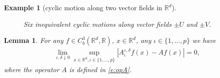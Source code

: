 \documentclass[10pt,a4paper]{amsart}
\newtheorem{exa}{Example}
\newtheorem{lem}{Lemma}
\newcommand{\bR}{\mathbb{R}}
\newcommand{\ba}{\begin{equation}\begin{aligned}}
\newcommand{\e}{\varepsilon}
\newcommand{\ea}{\end{aligned}\end{equation}}
\begin{document}
\begin{exa}[cyclic motion along two vector fields in $\bR^d$]
\begin{figure}
\begin{center}

\end{center}
\caption{Six inequivalent cyclic motions along vector fields $\pm U$ and $\pm V$.\label{f:two}}
\end{figure}
\end{exa}

\begin{lem}
\label{l:A}
For any $f\in C^3_b(\bR^d,\bR)$,
$x\in\bR^d$, any $\iota\in \{1,\dots,p\}$ we have
\ba
\label{e:Aiota}
\lim_{\e,\delta \downarrow 0} \sup_{x\in\mathbb R^d,\iota\in\{1,\dots,p\}}
|A_\iota^{\e,\delta }f(x) -A f(x)|=0,
\ea
where the operator $A$ is defined in \eqref{e:opA}.
\end{lem}
\end{document}
